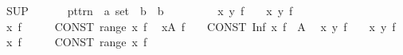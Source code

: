 \begin{isabellebody}
\ \ {\isachardoublequoteopen}{\isacharunderscore}{\kern0pt}SUP{\isachardoublequoteclose}\ \ \ \ \ \ {\isacharcolon}{\kern0pt}{\isacharcolon}{\kern0pt}\ {\isachardoublequoteopen}pttrn\ {\isasymRightarrow}\ {\isacharprime}{\kern0pt}a\ set\ {\isasymRightarrow}\ {\isacharprime}{\kern0pt}b\ {\isasymRightarrow}\ {\isacharprime}{\kern0pt}b{\isachardoublequoteclose}\ \ {\isacharparenleft}{\kern0pt}{\isachardoublequoteopen}{\isacharparenleft}{\kern0pt}{}{\isasymSqunion}{\isacharunderscore}{\kern0pt}{\isasymin}{\isacharunderscore}{\kern0pt}{\isachardot}{\kern0pt}{\isacharslash}{\kern0pt}\ {\isacharunderscore}{\kern0pt}{\isacharparenright}{\kern0pt}{\isachardoublequoteclose}\ {\isacharbrackleft}{\kern0pt}{}{\isacharcomma}{\kern0pt}\ {}{\isacharcomma}{\kern0pt}\ {}{}{\isacharbrackright}{\kern0pt}\ {}{}{\isacharparenright}{\kern0pt}\isanewline
\isanewline
{}\isamarkupfalse%
\isanewline
\ \ {\isachardoublequoteopen}{\isasymSqinter}x\ y{\isachardot}{\kern0pt}\ f{\isachardoublequoteclose}\ \ \ {\isasymrightleftharpoons}\ {\isachardoublequoteopen}{\isasymSqinter}x{\isachardot}{\kern0pt}\ {\isasymSqinter}y{\isachardot}{\kern0pt}\ f{\isachardoublequoteclose}\isanewline
\ \ {\isachardoublequoteopen}{\isasymSqinter}x{\isachardot}{\kern0pt}\ f{\isachardoublequoteclose}\ \ \ \ \ {\isasymrightleftharpoons}\ {\isachardoublequoteopen}{\isasymSqinter}{\isacharparenleft}{\kern0pt}CONST\ range\ {\isacharparenleft}{\kern0pt}{\isasymlambda}x{\isachardot}{\kern0pt}\ f{\isacharparenright}{\kern0pt}{\isacharparenright}{\kern0pt}{\isachardoublequoteclose}\isanewline
\ \ {\isachardoublequoteopen}{\isasymSqinter}x{\isasymin}A{\isachardot}{\kern0pt}\ f{\isachardoublequoteclose}\ \ \ {\isasymrightleftharpoons}\ {\isachardoublequoteopen}CONST\ Inf\ {\isacharparenleft}{\kern0pt}{\isacharparenleft}{\kern0pt}{\isasymlambda}x{\isachardot}{\kern0pt}\ f{\isacharparenright}{\kern0pt}\ {\isacharbackquote}{\kern0pt}\ A{\isacharparenright}{\kern0pt}{\isachardoublequoteclose}\isanewline
\ \ {\isachardoublequoteopen}{\isasymSqunion}x\ y{\isachardot}{\kern0pt}\ f{\isachardoublequoteclose}\ \ \ {\isasymrightleftharpoons}\ {\isachardoublequoteopen}{\isasymSqunion}x{\isachardot}{\kern0pt}\ {\isasymSqunion}y{\isachardot}{\kern0pt}\ f{\isachardoublequoteclose}\isanewline
\ \ {\isachardoublequoteopen}{\isasymSqunion}x{\isachardot}{\kern0pt}\ f{\isachardoublequoteclose}\ \ \ \ \ {\isasymrightleftharpoons}\ {\isachardoublequoteopen}{\isasymSqunion}{\isacharparenleft}{\kern0pt}CONST\ range\ {\isacharparenleft}{\kern0pt}{\isasymlambda}x{\isachardot}{\kern0pt}\ f{\isacharparenright}{\kern0pt}{\isacharparenright}{\kern0pt}{\isachardoublequoteclose}\isanewline

\end{isabellebody}
